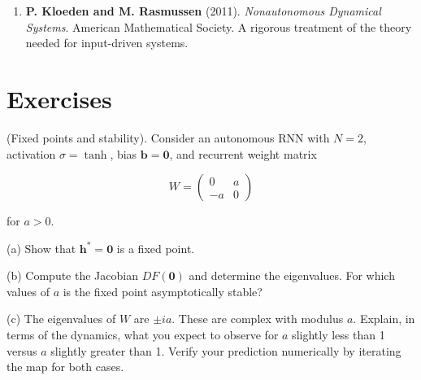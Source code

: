 \begin{enumerate}[nosep]
  \item \textbf{P. Kloeden and M. Rasmussen} (2011). \textit{Nonautonomous Dynamical Systems}. American Mathematical Society. A rigorous treatment of the theory needed for input-driven systems.


\bigskip

\end{enumerate}

\section*{Exercises}

\begin{exercise}
(Fixed points and stability). Consider an autonomous RNN with $N = 2$, activation $\sigma = \tanh$, bias $\mathbf{b} = \mathbf{0}$, and recurrent weight matrix

\[
W = \begin{pmatrix} 0 & a \\ -a & 0 \end{pmatrix}
\]

for $a > 0$.

(a) Show that $\mathbf{h}^* = \mathbf{0}$ is a fixed point.

(b) Compute the Jacobian $DF(\mathbf{0})$ and determine the eigenvalues. For which values of $a$ is the fixed point asymptotically stable?

(c) The eigenvalues of $W$ are $\pm ia$. These are complex with modulus $a$. Explain, in terms of the dynamics, what you expect to observe for $a$ slightly less than 1 versus $a$ slightly greater than 1. Verify your prediction numerically by iterating the map for both cases.


\bigskip

\end{exercise}


